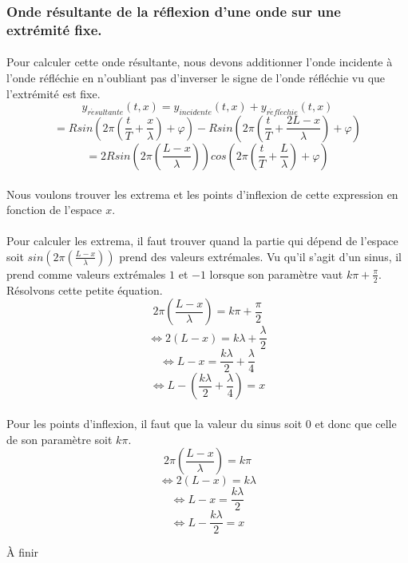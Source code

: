 \documentclass[a4paper]{article}
\begin{document}
\subsubsection{Onde résultante de la réflexion d'une onde sur une extrémité fixe.}
\paragraph{}Pour calculer cette onde résultante, nous devons additionner l'onde incidente à l'onde réfléchie en n'oubliant pas d'inverser le signe de l'onde réfléchie vu que l'extrémité est fixe.
\[y_{r\acute{e}sultante}(t,x)=y_{incidente}(t,x)+y_{r\acute{e}fl\acute{e}chie}(t,x)\]
\[=Rsin\left(2\pi \left(\frac{t}{T}+\frac{x}{\lambda}\right)+\varphi\right)-Rsin\left(2\pi \left(\frac{t}{T}+\frac{2L-x}{\lambda}\right)+\varphi\right)\]
\[=2Rsin\left(2\pi \left(\frac{L-x}{\lambda}\right)\right)cos\left(2\pi \left(\frac{t}{T}+\frac{L}{\lambda}\right)+\varphi\right)\]
\paragraph{}Nous voulons trouver les extrema et les points d'inflexion de cette expression en fonction de l'espace $x$.
\paragraph{}Pour calculer les extrema, il faut trouver quand la partie qui dépend de l'espace soit $sin\left(2\pi \left(\frac{L-x}{\lambda}\right)\right)$ prend des valeurs extrémales. Vu qu'il s'agit d'un sinus, il prend comme valeurs extrémales $1$ et $-1$ lorsque son paramètre vaut $k\pi+\frac{\pi}{2}$. Résolvons cette petite équation.
\[2\pi\left(\frac{L-x}{\lambda}\right)=k\pi+\frac{\pi}{2}\]
\[\Leftrightarrow 2\left(L-x\right)=k\lambda+\frac{\lambda}{2}\]
\[\Leftrightarrow L-x=\frac{k\lambda}{2}+\frac{\lambda}{4}\]
\[\Leftrightarrow L-\left(\frac{k\lambda}{2}+\frac{\lambda}{4}\right)=x\]
\paragraph{}Pour les points d'inflexion, il faut que la valeur du sinus soit $0$ et donc que celle de son paramètre soit $k\pi$.
\[2\pi\left(\frac{L-x}{\lambda}\right)=k\pi\]
\[\Leftrightarrow 2\left(L-x\right)=k\lambda\]
\[\Leftrightarrow L-x=\frac{k\lambda}{2}\]
\[\Leftrightarrow L-\frac{k\lambda}{2}=x\]
\begin{center}\Huge{À finir}\end{center}
\end{document}
